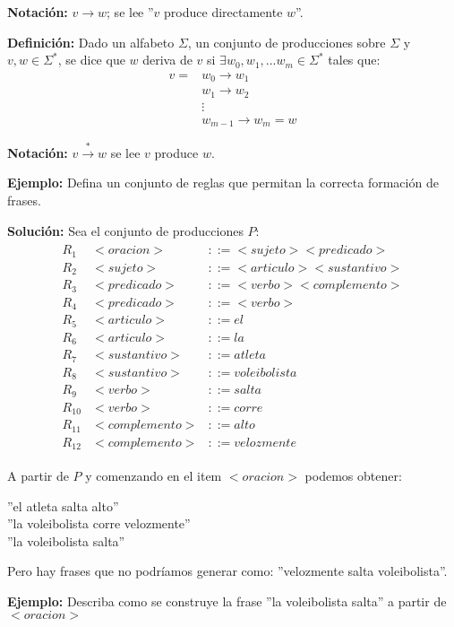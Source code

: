 \textbf{Notación: } $v\rightarrow w$; se lee ''$v$ produce directamente $w$''.

\textbf{Definición: } Dado un alfabeto $\Sigma$, un conjunto de producciones sobre $\Sigma$ y $v,w\in\Sigma^*$, se dice que $w$ deriva de $v$ si $\exists w_0,w_1,...w_m \in\Sigma^*$ tales que:
\begin{align*}
v	=&w_0\rightarrow w_1\\
	 & w_1\rightarrow w_2\\
	 &\vdots\\
	 &w_{m-1}\rightarrow w_m = w 
\end{align*}

\textbf{Notación: }$v\xrightarrow{*}w$ se lee $v$ produce $w$.

\textbf{Ejemplo: }Defina un conjunto de reglas que permitan la correcta formación de frases.

\textbf{Solución: }Sea el conjunto de producciones $P$:
\begin{align*}
\begin{array}{lrl}
	R_1	&	<oracion>&::=<sujeto><predicado>	\\
	R_2	&	<sujeto>&::=<articulo><sustantivo>	\\
	R_3	&	<predicado>&::=<verbo><complemento>	\\
	R_4	&	<predicado>&::=<verbo>	\\
	R_5	&	<articulo>&::=el	\\
	R_6	&	<articulo>&::=la	\\
	R_7	&	<sustantivo>&::=atleta	\\
	R_8	&	<sustantivo>&::=voleibolista	\\
	R_9	&	<verbo>&::=salta	\\
	R_{10}&	<verbo>&::=corre	\\
	R_{11}&	<complemento>&::=alto	\\
	R_{12}&	<complemento>&::=velozmente
\end{array}
\end{align*}

A partir de $P$ y comenzando en el item $<oracion>$ podemos obtener:
\begin{center}
	''el atleta salta alto''\\
	''la voleibolista corre velozmente''\\
	''la voleibolista salta''
\end{center}
Pero hay frases que no podríamos generar como: ''velozmente salta voleibolista''.

\textbf{Ejemplo: }Describa como se construye la frase ''la voleibolista salta'' a partir de $<oracion>$

